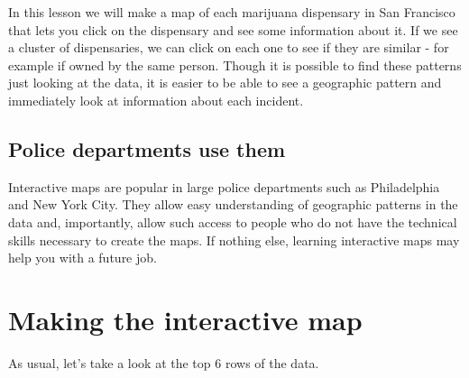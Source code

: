\documentclass[
  12pt,
  openany]{book}
\begin{document}
In this lesson we will make a map of each marijuana dispensary in San Francisco that lets you click on the dispensary and see some information about it. If we see a cluster of dispensaries, we can click on each one to see if they are similar - for example if owned by the same person. Though it is possible to find these patterns just looking at the data, it is easier to be able to see a geographic pattern and immediately look at information about each incident.

\hypertarget{police-departments-use-them}{%
\subsection{Police departments use them}\label{police-departments-use-them}}

Interactive maps are popular in large police departments such as Philadelphia and New York City. They allow easy understanding of geographic patterns in the data and, importantly, allow such access to people who do not have the technical skills necessary to create the maps. If nothing else, learning interactive maps may help you with a future job.

\hypertarget{making-the-interactive-map}{%
\section{Making the interactive map}\label{making-the-interactive-map}}

As usual, let's take a look at the top 6 rows of the data.
\end{document}
